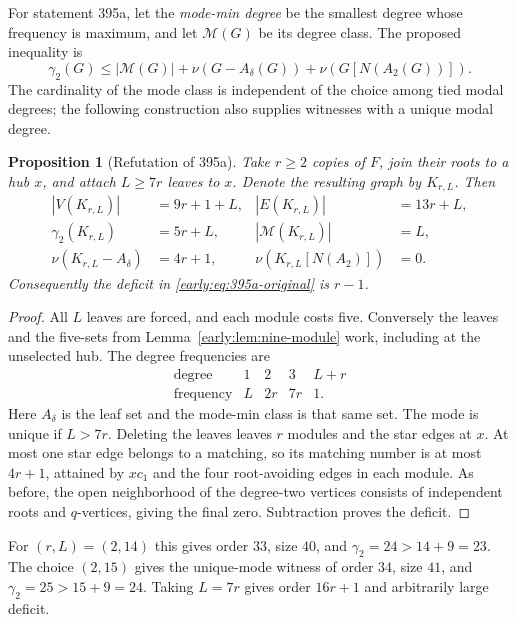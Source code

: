 \documentclass[11pt,a4paper]{article}
\newtheorem{proposition}[theorem]{Proposition}
\theoremstyle{definition}\newtheorem{definition}[theorem]{Definition}
\theoremstyle{remark}\newtheorem{remark}[theorem]{Remark}
\begin{document}
For statement 395a, let the \emph{mode-min degree} be the smallest degree
whose frequency is maximum, and let $\mathcal M(G)$ be its degree
class.  The proposed inequality is
\begin{equation}
 \gamma_2(G)\leq |\mathcal M(G)|+
 \nu(G-A_\delta(G))+\nu(G[N(A_2(G))]).
 \label{early:eq:395a-original}
\end{equation}
The cardinality of the mode class is independent of the choice among
tied modal degrees; the following construction also supplies witnesses
with a unique modal degree.

\begin{proposition}[Refutation of 395a]
\label{early:prop:395a}
Take $r\geq2$ copies of $F$, join their roots to a hub $x$, and attach
$L\geq7r$ leaves to $x$.  Denote the resulting graph by $K_{r,L}$.
Then
\begin{align*}
 |V(K_{r,L})|&=9r+1+L,& |E(K_{r,L})|&=13r+L,\\
 \gamma_2(K_{r,L})&=5r+L,&
 |\mathcal M(K_{r,L})|&=L,\\
 \nu(K_{r,L}-A_\delta)&=4r+1,&
 \nu(K_{r,L}[N(A_2)])&=0.
\end{align*}
Consequently the deficit in \eqref{early:eq:395a-original} is $r-1$.
\end{proposition}
\begin{proof}
All $L$ leaves are forced, and each module costs five.  Conversely the
leaves and the five-sets from Lemma~\ref{early:lem:nine-module} work,
including at the unselected hub.  The degree frequencies are
\[
\begin{array}{c|rrrr}
 \text{degree}&1&2&3&L+r\\\hline
 \text{frequency}&L&2r&7r&1.
\end{array}
\]
Here $A_\delta$ is the leaf set and the mode-min class is that same
set.  The mode is unique if $L>7r$.  Deleting the leaves leaves $r$
modules and the star edges at $x$.  At most one star edge belongs to a
matching, so its matching number is at most $4r+1$, attained by $xc_1$
and the four root-avoiding edges in each module.  As before, the open
neighborhood of the degree-two vertices consists of independent roots
and $q$-vertices, giving the final zero.  Subtraction proves the deficit.
\end{proof}

For $(r,L)=(2,14)$ this gives order $33$, size $40$, and
$\gamma_2=24>14+9=23$.  The choice $(2,15)$ gives the unique-mode
witness of order $34$, size $41$, and $\gamma_2=25>15+9=24$.
Taking $L=7r$ gives order $16r+1$ and arbitrarily large deficit.
\end{document}
